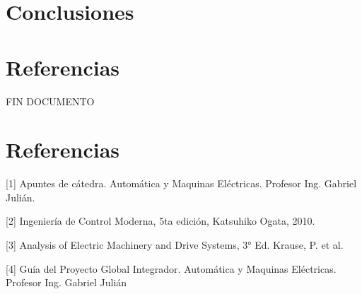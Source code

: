 \documentclass[11pt]{article}
\begin{document}
\section{Conclusiones}
\section{Referencias}










\newpage
FIN DOCUMENTO
\newpage






\section{Referencias}

[1] Apuntes de cátedra. Automática y Maquinas Eléctricas. Profesor Ing. Gabriel Julián.

[2] Ingeniería de Control Moderna, 5ta edición, Katsuhiko Ogata, 2010.

[3] Analysis of Electric Machinery and Drive Systems, 3° Ed. Krause, P. et al.

[4] Guía del Proyecto Global Integrador. Automática y Maquinas Eléctricas. Profesor Ing. Gabriel Julián
\end{document}
